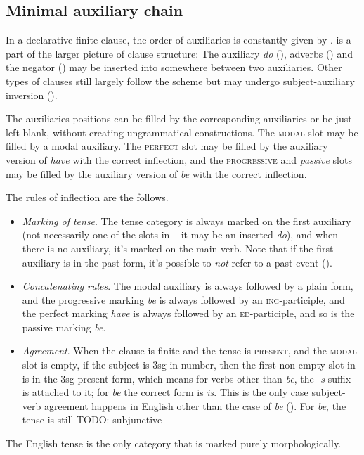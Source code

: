 \documentclass[UTF8, a4paper, oneside, scheme=plain, 12pt]{ctexbook}
\newcommand{\form}[1]{\emph{#1}}
\newcommand{\category}[1]{\textsc{#1}}
\newcommand{\formcat}[1]{\textsc{#1}}
\begin{document}
\subsection{Minimal auxiliary chain}\label{sec:auxiliary-chain}

In a declarative finite clause,  
the order of auxiliaries is constantly given by .
 is a part of the larger picture of clause structure:
The auxiliary \form{do} (), 
adverbs ()
and the negator ()
may be inserted into somewhere between two auxiliaries.
Other types of clauses still largely follow the scheme but 
may undergo subject-auxiliary inversion ().

The auxiliaries positions can be filled by the corresponding auxiliaries or be just left blank,
without creating ungrammatical constructions.
The \category{modal} slot may be filled by a modal auxiliary.
The \category{perfect} slot may be filled by the auxiliary version of \form{have} with the correct inflection,
and the \category{progressive} and \form{passive} slots 
may be filled by the auxiliary version of \form{be} with the correct inflection.

The rules of inflection are the follows.
\begin{itemize}
    \item \emph{Marking of tense}. The tense category is always marked on the first auxiliary
    (not necessarily one of the slots in 
    -- it may be an inserted \form{do}),
    and when there is no auxiliary,
    it's marked on the main verb.
    Note that if the first auxiliary is in the past form,
    it's possible to \emph{not} refer to a past event ().
    \item \emph{Concatenating rules}. The modal auxiliary is always followed by a plain form,
    and the progressive marking \form{be} is always followed by an \formcat{ing}-participle,
    and the perfect marking \form{have} is always followed by an \formcat{ed}-participle,
    and so is the passive marking \form{be}.
    \item \emph{Agreement}. When the clause is finite and the tense is \category{present},
    and the \category{modal} slot is empty,
    if the subject is 3sg in number,
    then the first non-empty slot in 
    is in the 3sg present form,
    which means for verbs other than \form{be}, the \form{-s} suffix is attached to it;
    for \form{be} the correct form is \form{is}.
    This is the only case subject-verb agreement happens in English 
    other than the case of \form{be} ().
    For \form{be}, the tense is still  TODO: subjunctive 
\end{itemize}
The English tense is the only category that is marked purely morphologically.
\end{document}
